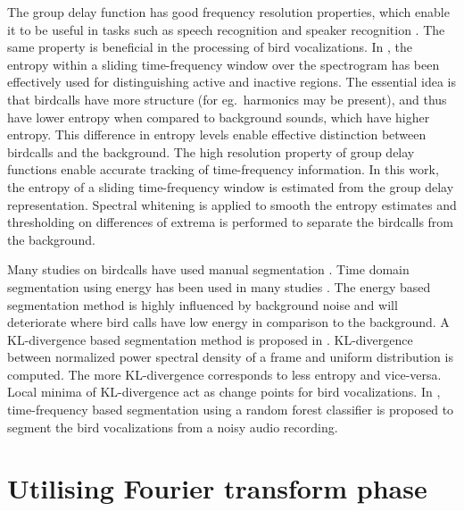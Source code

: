 \documentclass[a4paper]{article}
\begin{document}
The group delay function has good frequency resolution properties, which enable
it to be useful in tasks such as speech recognition and speaker recognition
\cite{hema} \cite{padman} \cite{modgdf}. The same property is beneficial in the
processing of bird vocalizations. In \cite{wang2013}, the entropy within a
sliding time-frequency window over the spectrogram has been effectively used for
distinguishing active and inactive regions. The essential idea is that birdcalls
have more structure (for eg.~harmonics may be present), and thus have lower
entropy when compared to background sounds, which have higher entropy. This
difference in entropy levels enable effective distinction between birdcalls and
the background.
The high resolution property of group delay functions enable accurate tracking
of time-frequency information. In this work, the entropy of a sliding
time-frequency window is estimated from the group delay representation. Spectral
whitening is applied to smooth the entropy estimates and thresholding on
differences of extrema is performed to separate the birdcalls from the
background.

Many studies on birdcalls have used manual segmentation \cite{Trifa} \cite{Lee}
\cite{Kaewtip}. Time domain segmentation using energy has been used in many
studies \cite{Harma} \cite{Somervuo} \cite{Fagerlund} . The energy  based
segmentation method is highly influenced by background noise and will
deteriorate  where bird calls have low energy in comparison to the background. A
KL-divergence based segmentation method is proposed in \cite{Lakshmi}.
KL-divergence between normalized power spectral density of a frame and uniform
distribution is computed. The more KL-divergence corresponds to less entropy and vice-versa. Local minima of KL-divergence act as
change points for bird vocalizations. In \cite{Neal}, time-frequency based
segmentation using a random forest classifier is proposed to  segment the bird vocalizations from a noisy audio recording. 





\section{Utilising Fourier transform phase}
\end{document}
